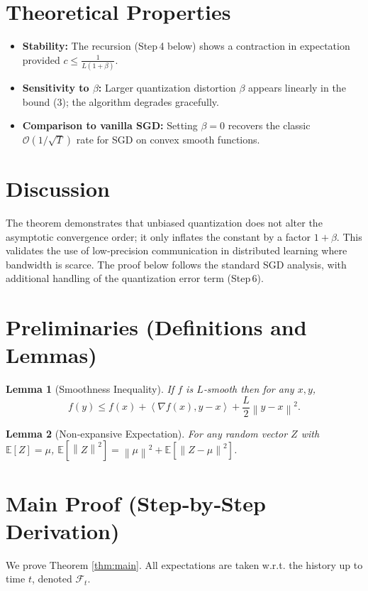 \documentclass{article}
\newtheorem{lemma}{Lemma}
\newcommand{\E}{\mathbb{E}}
\newcommand{\norm}[1]{\left\|#1\right\|}
\newcommand{\iprod}[2]{\left\langle #1,#2\right\rangle}
\begin{document}
\section*{Theoretical Properties}
\begin{itemize}
    \item \textbf{Stability:} The recursion (Step 4 below) shows a contraction in expectation provided $c\le\frac{1}{L(1+\beta)}$.
    \item \textbf{Sensitivity to $\beta$:} Larger quantization distortion $\beta$ appears linearly in the bound (3); the algorithm degrades gracefully.
    \item \textbf{Comparison to vanilla SGD:} Setting $\beta=0$ recovers the classic $\mathcal O(1/\sqrt{T})$ rate for SGD on convex smooth functions.
\end{itemize}

\section*{Discussion}
The theorem demonstrates that unbiased quantization does not alter the asymptotic convergence order; it only inflates the constant by a factor $1+\beta$. This validates the use of low‑precision communication in distributed learning where bandwidth is scarce. The proof below follows the standard SGD analysis, with additional handling of the quantization error term (Step 6).

\newpage
\section*{Preliminaries (Definitions and Lemmas)}
\begin{lemma}[Smoothness Inequality]\label{lem:smooth}
If $f$ is $L$‑smooth then for any $x,y$,
\[
f(y)\le f(x)+\iprod{\nabla f(x)}{y-x}+\frac{L}{2}\norm{y-x}^{2}.
\]
\end{lemma}
\begin{lemma}[Non‑expansive Expectation]\label{lem:exp}
For any random vector $Z$ with $\E[Z]=\mu$, $\E[\norm{Z}^{2}]=\norm{\mu}^{2}+\E[\norm{Z-\mu}^{2}]$.
\end{lemma}

\section*{Main Proof (Step‑by‑Step Derivation)}
We prove Theorem \ref{thm:main}.  All expectations are taken w.r.t. the history up to time $t$, denoted $\mathcal F_t$.
\end{document}
